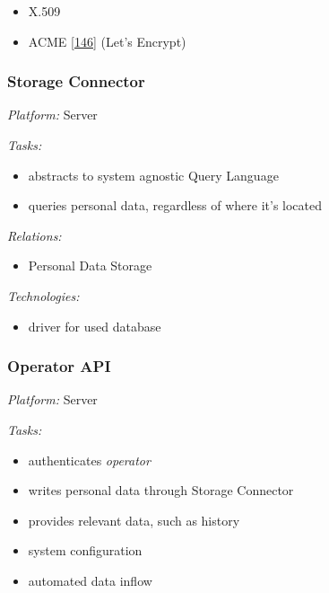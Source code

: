 \documentclass[12pt,english,a4paper,titlepage,cleardoublepage=empty,dottedtoc]{report}
\providecommand{\tightlist}{%
  \setlength{\itemsep}{0pt}\setlength{\parskip}{0pt}}
\begin{document}
\begin{itemize}
\tightlist
\item
  X.509
\item
  ACME {[}\protect\hyperlink{ref-web_spec_acme}{146}{]} (Let's Encrypt)
\end{itemize}

\subsubsection*{Storage Connector}\label{storage-connector}

\emph{Platform:} Server

\emph{Tasks:}

\begin{itemize}
\tightlist
\item
  abstracts to system agnostic Query Language
\item
  queries personal data, regardless of where it's located
\end{itemize}

\emph{Relations:}

\begin{itemize}
\tightlist
\item
  Personal Data Storage
\end{itemize}

\emph{Technologies:}

\begin{itemize}
\tightlist
\item
  driver for used database
\end{itemize}

\subsubsection*{Operator API}\label{operator-api}

\emph{Platform:} Server

\emph{Tasks:}

\begin{itemize}
\tightlist
\item
  authenticates \emph{operator}
\item
  writes personal data through Storage Connector
\item
  provides relevant data, such as history
\item
  system configuration
\item
  automated data inflow
\end{itemize}
\end{document}
